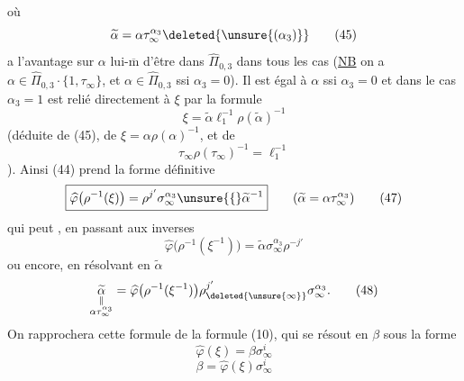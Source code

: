 où 
\[
\widetilde\alpha=\alpha\tau_\infty^{\alpha_3}\deleted{\unsure{(\alpha_3)}}
\tag{45}
\]
a l'avantage sur $\alpha$ lui-$\overline{\mathrm m}$ d'être dans $\widehat\Pi_{0,3}$ dans tous les cas (\uline{NB} on a
$\alpha\in\widehat\Pi_{0,3}\cdot\{1,\tau_\infty\}$, et $\alpha\in\widehat\Pi_{0,3}$ ssi $\alpha_3=0$).
Il est égal à $\alpha$ ssi $\alpha_3=0$ et dans le cas $\alpha_3=1$  est relié directement à $\xi$ par la formule
\[
\xi=\widetilde\alpha\ell_1^{-1}\rho(\widetilde\alpha)^{-1}
\tag{46}
\]
(déduite de (45), de $\xi=\alpha\rho(\alpha)^{-1}$, et de
\[
\tau_\infty\rho(\tau_\infty)^{-1}=\ell_1^{-1}
\tag{**}
\]
).
Ainsi (44) prend la forme définitive
\[
\boxed{\widehat{\varphi}\bigl(\rho^{-1}(\xi)\bigr)=\rho^{j'}\sigma_\infty^{\alpha_3}\unsure{\lbrace}\widetilde\alpha^{-1}}
\qquad(\widetilde\alpha=\alpha\tau_\infty^{\alpha_3})
\tag{47}
\]
qui peut  , en passant aux inverses
\[
\widehat{\varphi}\bigl(\rho^{-1}(\xi^{-1})\bigr)=\widetilde\alpha\sigma_\infty^{\alpha_3}\rho^{-j'}
\tag{47 bis}
\]
ou encore, en résolvant en $\widetilde\alpha$
\[
\underset{\substack{\Vert\\\alpha\tau_\infty^{\alpha_3}}}{\widetilde\alpha}
=\widehat{\varphi}\bigl(\rho^{-1}(\xi^{-1})\bigr)\rho_{\deleted{\unsure{\infty}}}^{j'}\sigma_\infty^{\alpha_3}.
\tag{48}
\]
On rapprochera cette formule de la formule (10), qui se résout en $\beta$ sous la forme
\[
\widehat{\varphi}(\xi)=\beta\sigma_\infty^i
\tag*{(49)=(10)}
\]
\[
\beta=\widehat{\varphi}(\xi)\sigma_\infty^i
\tag{50}
\]


